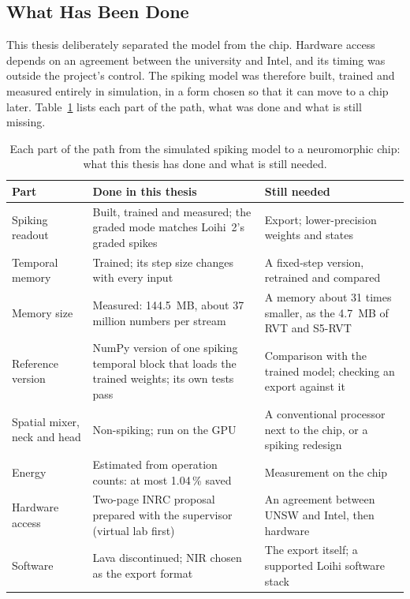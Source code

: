 \documentclass[11pt, a4paper]{report}
\begin{document}
\subsection{What Has Been Done}
This thesis deliberately separated the model from the chip. Hardware access depends on an agreement between
the university and Intel, and its timing was outside the project's control. The spiking model was
therefore built, trained and measured entirely in simulation, in a form chosen so that it can move to a chip
later. Table~\ref{tab:deploy} lists each part of the path, what was done and what is still missing.
\begin{table}[htbp]
\centering
\small
\caption[The neuromorphic deployment path: done and still needed]{Each part of the path from the simulated
    spiking model to a neuromorphic chip: what this thesis has done and what is still needed.}
\label{tab:deploy}
\begin{tabularx}{\textwidth}{@{}>{\raggedright\arraybackslash}p{2.9cm}>{\raggedright\arraybackslash}X>{\raggedright\arraybackslash}X@{}}
\toprule
\textbf{Part} & \textbf{Done in this thesis} & \textbf{Still needed} \\
\midrule
Spiking readout & Built, trained and measured; the graded mode matches Loihi~2's graded spikes
  & Export; lower-precision weights and states \\
Temporal memory & Trained; its step size changes with every input & A fixed-step version, retrained and compared \\
Memory size & Measured: 144.5~MB, about 37 million numbers per stream & A memory about 31 times smaller, as the 4.7~MB of RVT and S5-RVT \\
Reference version & NumPy version of one spiking temporal block that loads the trained weights; its own tests pass
  & Comparison with the trained model; checking an export against it \\
Spatial mixer, neck and head & Non-spiking; run on the GPU
  & A conventional processor next to the chip, or a spiking redesign \\
Energy & Estimated from operation counts: at most 1.04\,\% saved & Measurement on the chip \\
Hardware access & Two-page INRC proposal prepared with the supervisor (virtual lab first)
  & An agreement between UNSW and Intel, then hardware \\
Software & Lava discontinued; NIR chosen as the export format & The export itself; a supported Loihi software stack \\
\bottomrule
\end{tabularx}
\end{table}
\end{document}
